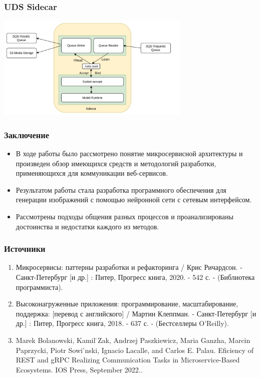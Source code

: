 \documentclass{beamer}
\begin{document}
\begin{frame}
	\frametitle{UDS Sidecar}
	\centering
	\includegraphics[height=5cm]{img/side3.jpg}
\end{frame}



\begin{frame}
	\frametitle{Заключение}
	\begin{itemize}
	\item В ходе работы было рассмотрено понятие микросервисной архитектуры и произведен обзор имеющихся средств и методологий разработки, применяющихся для коммуникации веб-сервисов.
	\item Результатом работы стала разработка программного обеспечения для генерации изображений с помощью нейронной сети с сетевым интерфейсом. 
	\item Рассмотрены подходы общения разных процессов и проанализированы достоинства и недостатки каждого из методов.
	\end{itemize}
\end{frame}

\begin{frame}
	\frametitle{Источники}
	\begin{enumerate}
		\item Микросервисы: паттерны разработки и рефакторинга / Крис Ричардсон. - Санкт-Петербург [и др.] : Питер, Прогресс книга, 2020. - 542 с. -  (Библиотека программиста). 
		\item Высоконагруженные приложения: программирование, масштабирование, поддержка: [перевод с английского] / Мартин Клеппман. - Санкт-Петербург [и др.] : Питер, Прогресс книга, 2018. - 637 с. -  (Бестселлеры O'Reilly). 
		\item Marek Bolanowski, Kamil  ̇Zak, Andrzej Paszkiewicz, Maria Ganzha, Marcin Paprzycki, Piotr Sowi ́nski, Ignacio Lacalle, and Carlos E. Palau. Eficiency of REST and gRPC Realizing Communication Tasks in Microservice-Based Ecosystems. IOS Press, September 2022..
	\end{enumerate}
\end{frame}
\end{document}
